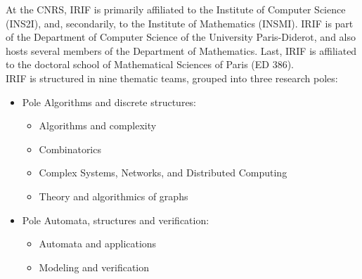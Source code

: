 At the CNRS, IRIF is primarily affiliated to the Institute of Computer Science (INS2I), and, secondarily, to the Institute of Mathematics (INSMI). IRIF is part of the Department of Computer Science of the University Paris-Diderot, and also hosts several members of the Department of Mathematics. Last, IRIF is affiliated to the doctoral school of Mathematical Sciences of Paris (ED 386).\\ 

IRIF is structured in nine thematic teams, grouped into three research poles: 
\begin{itemize}
\item Pole Algorithms and discrete structures:

\begin{itemize}
\item Algorithms and complexity
\end{itemize}

\begin{itemize}
\item Combinatorics
\end{itemize}

\begin{itemize}
\item Complex Systems, Networks, and Distributed Computing 
\end{itemize}

\begin{itemize}
\item Theory and algorithmics of graphs 
\end{itemize}

\end{itemize}

\begin{itemize}
\item Pole Automata, structures and verification:

\begin{itemize}
\item Automata and applications
\end{itemize}
\begin{itemize}
\item Modeling and verification
\end{itemize}

\end{itemize}


